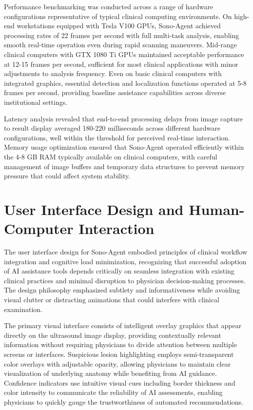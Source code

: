Performance benchmarking was conducted across a range of hardware configurations representative of typical clinical computing environments. On high-end workstations equipped with Tesla V100 GPUs, Sono-Agent achieved processing rates of 22 frames per second with full multi-task analysis, enabling smooth real-time operation even during rapid scanning maneuvers. Mid-range clinical computers with GTX 1080 Ti GPUs maintained acceptable performance at 12-15 frames per second, sufficient for most clinical applications with minor adjustments to analysis frequency. Even on basic clinical computers with integrated graphics, essential detection and localization functions operated at 5-8 frames per second, providing baseline assistance capabilities across diverse institutional settings.

Latency analysis revealed that end-to-end processing delays from image capture to result display averaged 180-220 milliseconds across different hardware configurations, well within the threshold for perceived real-time interaction. Memory usage optimization ensured that Sono-Agent operated efficiently within the 4-8 GB RAM typically available on clinical computers, with careful management of image buffers and temporary data structures to prevent memory pressure that could affect system stability.

\section{User Interface Design and Human-Computer Interaction}

The user interface design for Sono-Agent embodied principles of clinical workflow integration and cognitive load minimization, recognizing that successful adoption of AI assistance tools depends critically on seamless integration with existing clinical practices and minimal disruption to physician decision-making processes. The design philosophy emphasized subtlety and informativeness while avoiding visual clutter or distracting animations that could interfere with clinical examination.

The primary visual interface consists of intelligent overlay graphics that appear directly on the ultrasound image display, providing contextually relevant information without requiring physicians to divide attention between multiple screens or interfaces. Suspicious lesion highlighting employs semi-transparent color overlays with adjustable opacity, allowing physicians to maintain clear visualization of underlying anatomy while benefiting from AI guidance. Confidence indicators use intuitive visual cues including border thickness and color intensity to communicate the reliability of AI assessments, enabling physicians to quickly gauge the trustworthiness of automated recommendations.

